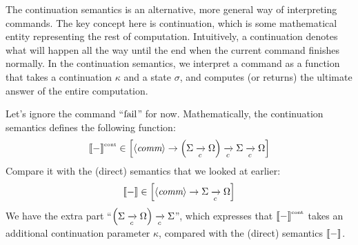 \begin{enumcirc}
	\item
	The continuation semantics is an alternative, more general way of interpreting
	commands.
	The key concept here is continuation, which is some mathematical entity
	representing the rest of computation.
	Intuitively, a continuation denotes what will happen all the way until the end
	when the current command finishes normally.
	In the continuation semantics, we interpret a command as a function that takes
	a continuation $\kappa$ and a state $\sigma$, and computes (or returns) the
	ultimate answer of the entire computation.
	\item
	Let's ignore the command ``$\textrm{fail}$'' for now.
	Mathematically, the continuation semantics defines the following function:
	\[
		\left\llbracket - \right\rrbracket^{\textrm{\tiny cont}} \in
		\left[ \left\langle \textit{comm} \right\rangle \to \left( \Sigma \xrightarrow[c]{} \Omega \right) \xrightarrow[c]{} \Sigma \xrightarrow[c]{} \Omega \right]
	\]
	Compare it with the (direct) semantics that we looked at earlier:
	\[
		\left\llbracket - \right\rrbracket \in \left[ \left\langle \textit{comm} \right\rangle \to \Sigma \xrightarrow[c]{} \Omega \right]
	\]
	We have the extra part
	``$\left( \Sigma \xrightarrow[c]{} \Omega \right) \xrightarrow[c]{} \Sigma$'',
	which expresses that $\left\llbracket - \right\rrbracket^{\textrm{\tiny cont}}$ takes an additional
	continuation parameter $\kappa$, compared with the (direct) semantics
	$\left\llbracket - \right\rrbracket$.


\end{enumcirc}
